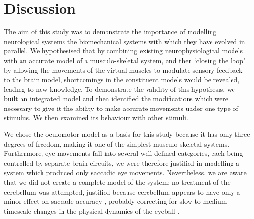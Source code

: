 \documentclass{frontiersSCNS}
\begin{document}





\section{Discussion}

The aim of this study was to demonstrate the importance of modelling
neurological systems  the biomechanical systems
with which they have evolved in parallel. We hypothesised that by combining
existing neurophysiological models with an accurate
model of a musculo-skeletal system, and then `closing the loop' by allowing
the movements of the virtual muscles to modulate sensory feedback to
the brain model, shortcomings in the constituent models would be
revealed, leading to new knowledge. To demonstrate the validity
of this hypothesis, we built an integrated model and then identified the
modifications which were necessary to give it the ability to make
accurate movements under one type of stimulus. We then
examined its behaviour with other stimuli.

We chose the oculomotor model as a basis for this study because it has
only three degrees of freedom, making it one of the simplest
musculo-skeletal systems. Furthermore, eye movements fall into several
well-defined categories, each being controlled by separate
brain circuits, we were therefore justified in modelling a
system which produced only saccadic eye movements. Nevertheless, we are
aware that we did not create a complete model of the system; no treatment
of the cerebellum was attempted, justified because cerebellum appears to have
only a minor effect on saccade accuracy \citep{dean_adaptive_2008}, probably correcting
for slow to medium timescale changes in the physical dynamics of the
eyeball \citep{dean_learning_1994}.
\end{document}
